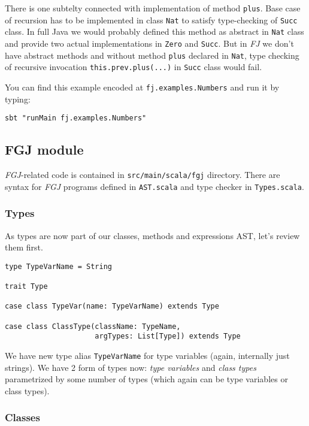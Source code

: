 \documentclass{article}[12pt]
\begin{document}
There is one subtelty connected with implementation of method
\texttt{plus}. Base case of recursion has to be implemented in
class \texttt{Nat} to satisfy type-checking of \texttt{Succ}
class. In full Java we would probably defined this method as
abstract in \texttt{Nat} class and provide two actual
implementations in \texttt{Zero} and \texttt{Succ}. But in
\emph{FJ} we don't have abstract methods and without method
\texttt{plus} declared in \texttt{Nat}, type checking of
recursive invocation \texttt{this.prev.plus(...)} in
\texttt{Succ} class would fail.

You can find this example encoded at \texttt{fj.examples.Numbers}
and run it by typing:

\begin{verbatim}
sbt "runMain fj.examples.Numbers"
\end{verbatim}


\subsection{FGJ module}

\emph{FGJ}-related code is contained in \texttt{src/main/scala/fgj}
directory. There are syntax for \emph{FGJ} programs defined in
\texttt{AST.scala} and type checker in \texttt{Types.scala}.

\subsubsection{Types}

As types are now part of our classes, methods and expressions
AST, let's review them first.

\begin{verbatim}
type TypeVarName = String

trait Type

case class TypeVar(name: TypeVarName) extends Type

case class ClassType(className: TypeName,
                     argTypes: List[Type]) extends Type
\end{verbatim}

We have new type alias \texttt{TypeVarName} for type variables
(again, internally just strings). We have 2 form of types now:
\emph{type variables} and \emph{class types} parametrized by
some number of types (which again can be type variables or
class types).

\subsubsection{Classes}
\end{document}
